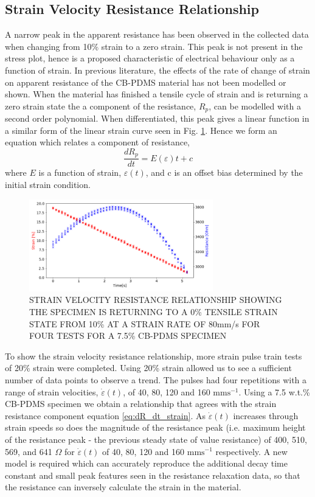 \subsection*{Strain Velocity Resistance Relationship}
A narrow peak in the apparent resistance has been observed in the collected data when changing from 10\% strain to a zero strain. This peak is not present in the stress plot, hence is a proposed characteristic of electrical behaviour only as a function of strain. In previous literature, the effects of the rate of change of strain on apparent resistance of the CB-PDMS material has not been modelled or shown. When the material has finished a tensile cycle of strain and is returning a zero strain state the a component of the resistance, $R_p$, can be modelled with a second order polynomial. When differentiated, this peak gives a linear function in a similar form of the linear strain curve seen in Fig. \ref{fig:poly2_r_strain}. Hence we form an equation which relates a component of resistance,
\begin{equation} 
	\frac{dR_p}{dt} = E(\varepsilon)t + c
	\label{eq:dR_dt_strain}
\end{equation}
where $E$ is a function of strain, $\varepsilon(t)$, and c is an offset bias determined by the initial strain condition.
\begin{figure}[h!]
	\centering
	\includegraphics[width=8cm]{Figures/strain_velocity_res_80mms_2_7-5_E4pin_20mm_v11_0.2Strain_velocityprof.png}
	\caption{STRAIN VELOCITY RESISTANCE RELATIONSHIP SHOWING THE SPECIMEN IS RETURNING TO A 0\% TENSILE STRAIN STATE FROM 10\% AT A STRAIN RATE OF 80mm/s FOR FOUR TESTS FOR A 7.5\% CB-PDMS SPECIMEN}
	\label{fig:poly2_r_strain}
\end{figure}
To show the strain velocity resistance relationship, more strain pulse train tests of 20\% strain were completed. Using 20\% strain allowed us to see a sufficient number of data points to observe a trend. The pulses had four repetitions with a range of strain velocities, $\dot{\varepsilon}(t)$, of 40, 80, 120 and 160 $\mathrm{mms^{-1}}$. Using a 7.5 w.t.\% CB-PDMS specimen we obtain a relationship that agrees with the strain resistance component equation \ref{eq:dR_dt_strain}. As $\dot{\varepsilon}(t)$ increases through strain speeds so does the magnitude of the resistance peak (i.e. maximum height of the resistance peak - the previous steady state of value resistance) of 400, 510, 569, and 641 $\Omega$ for $\dot{\varepsilon}(t)$ of 40, 80, 120 and 160 $\mathrm{mms^{-1}}$  respectively. A new model is required which can accurately reproduce the additional decay time constant and small peak features seen in the resistance relaxation data, so that the resistance can inversely calculate the strain in the material. 

